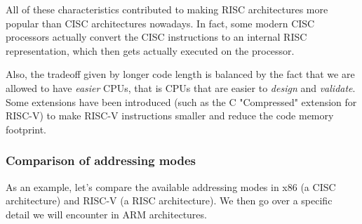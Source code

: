 \documentclass[a4paper,11pt]{article}
\begin{document}
All of these characteristics contributed to making RISC architectures more popular than CISC architectures nowadays.
In fact, some modern CISC processors actually convert the CISC instructions to an internal RISC representation, which then gets actually executed on the processor.

Also, the tradeoff given by longer code length is balanced by the fact that we are allowed to have \textit{easier} CPUs, that is CPUs that are easier to \textit{design} and \textit{validate}.
Some extensions have been introduced (such as the C "Compressed" extension for RISC-V) to make RISC-V instructions smaller and reduce the code memory footprint.

\subsubsection{Comparison of addressing modes}

As an example, let's compare the available addressing modes in x86 (a CISC architecture) and RISC-V (a RISC architecture).
We then go over a specific detail we will encounter in ARM architectures.

\lstset{language=x86}
\end{document}
